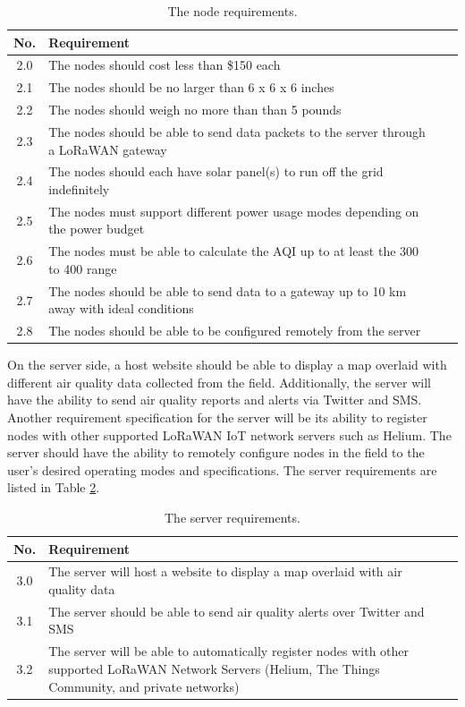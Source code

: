 \begin{table}[H]
\centering
\caption{The node requirements.}
\begin{tabularx}{\linewidth}{|c|X|c|c|}
\hline
No. & Requirement \\
\hline\hline
2.0 & The nodes should cost less than \$150 each \\\hline
2.1 & The nodes should be no larger than 6 x 6 x 6 inches \\\hline
2.2 & The nodes should weigh no more than than 5 pounds \\\hline
2.3 & The nodes should be able to send data packets to the server through a LoRaWAN gateway \\\hline
2.4 & The nodes should each have solar panel(s) to run off the grid indefinitely \\\hline
2.5 & The nodes must support different power usage modes depending on the power budget \\\hline
2.6 & The nodes must be able to calculate the AQI up to at least the 300 to 400 range \\\hline
2.7 & The nodes should be able to send data to a gateway up to 10 km away with ideal conditions \\\hline
2.8 & The nodes should be able to be configured remotely from the server \\\hline
\end{tabularx}
\label{tab:node-requirements}
\end{table}

On the server side, a host website should be able to display a map overlaid with different air quality data collected from the field. Additionally, the server will have the ability to send air quality reports and alerts via Twitter and SMS. Another requirement specification for the server will be its ability to register nodes with other supported LoRaWAN IoT network servers such as Helium. The server should have the ability to remotely configure nodes in the field to the user's desired operating modes and specifications. The server requirements are listed in Table \ref{tab:server-requirements}. 

\begin{table}[H]
\centering
\caption{The server requirements.}
\begin{tabularx}{\linewidth}{|c|X|c|c|}
\hline
No. & Requirement \\
\hline\hline
3.0 & The server will host a website to display a map overlaid with air quality data \\\hline
3.1 & The server should be able to send air quality alerts over Twitter and SMS \\\hline
3.2 & The server will be able to automatically register nodes with other supported LoRaWAN Network Servers (Helium, The Things Community, and private networks) \\\hline
\end{tabularx}
\label{tab:server-requirements}
\end{table}




